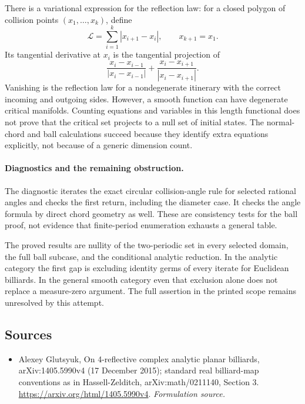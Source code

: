 \documentclass[11pt]{article}
\begin{document}
There is a variational expression for the reflection law: for a
closed polygon of collision points $(x_1,\ldots,x_k)$, define
\[
 \mathcal L=\sum_{i=1}^k|x_{i+1}-x_i|,\qquad x_{k+1}=x_1.
\]
Its tangential derivative at $x_i$ is the tangential projection of
\[
 \frac{x_i-x_{i-1}}{|x_i-x_{i-1}|}
       +\frac{x_i-x_{i+1}}{|x_i-x_{i+1}|}.
\]
Vanishing is the reflection law for a nondegenerate itinerary with
the correct incoming and outgoing sides. However, a smooth function
can have degenerate critical manifolds. Counting equations and
variables in this length functional does not prove that the critical
set projects to a null set of initial states. The normal-chord and
ball calculations succeed because they identify extra equations
explicitly, not because of a generic dimension count.

\paragraph{Diagnostics and the remaining obstruction.}
The diagnostic iterates the exact circular collision-angle rule
for selected rational angles and checks the first return, including
the diameter case. It checks the angle formula by direct chord
geometry as well. These are consistency tests for the ball proof,
not evidence that finite-period enumeration exhausts a general table.

The proved results are nullity of the two-periodic set in every
selected domain, the full ball subcase, and the conditional analytic
reduction. In the analytic category the first gap is excluding
identity germs of every iterate for Euclidean billiards. In the
general smooth category even that exclusion alone does not replace
a measure-zero argument. The full assertion in the printed scope
remains unresolved by this attempt.
\subsection{Sources}
\begin{itemize}
\item[S1]Alexey Glutsyuk, On 4-reflective complex analytic planar billiards, arXiv:1405.5990v4 (17 December 2015); standard real billiard-map conventions as in Hassell-Zelditch, arXiv:math/0211140, Section 3.
\url{https://arxiv.org/html/1405.5990v4}.
\textit{Formulation source.}
\end{itemize}
\end{document}

